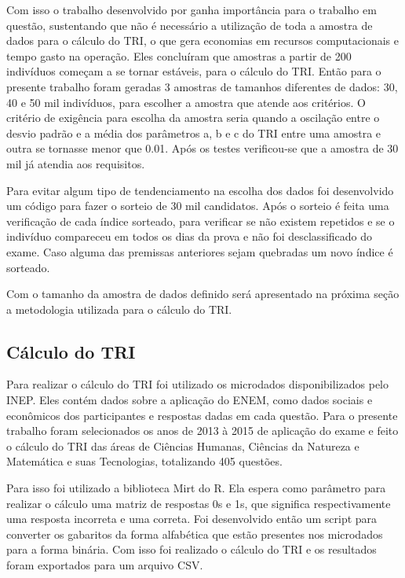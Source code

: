 \documentclass[article,	12pt,	oneside, a4paper,	english, brazil, sumario=tradicional, section=TITLE]{abntex2}
\begin{document}
 	Com isso o trabalho desenvolvido por \cite{sancineto2005impacto} ganha importância para o trabalho em questão, sustentando que não é necessário a utilização de toda a amostra de dados para o cálculo do TRI, o que gera economias em recursos computacionais e tempo gasto na operação. Eles concluíram que amostras a partir de 200 indivíduos começam a se tornar estáveis, para o cálculo do TRI. Então para o presente trabalho foram geradas 3 amostras de tamanhos diferentes de dados: 30, 40 e 50 mil indivíduos, para escolher a amostra que atende aos critérios. O critério de exigência para escolha da amostra seria quando a oscilação entre o desvio padrão e a média dos parâmetros a, b e c do TRI entre uma amostra e outra se tornasse menor que 0.01. Após os testes verificou-se que a amostra de 30 mil já atendia aos requisitos.
    
 	Para evitar algum tipo de tendenciamento na escolha dos dados foi desenvolvido um código para fazer o sorteio de 30 mil candidatos. Após o sorteio é feita uma verificação de cada índice sorteado, para verificar se não existem repetidos e se o indivíduo compareceu em todos os dias da prova e não foi desclassificado do exame. Caso alguma das premissas anteriores sejam quebradas um novo índice é sorteado.
   
   Com o tamanho da amostra de dados definido será apresentado na próxima seção a metodologia utilizada para o cálculo do TRI.

\subsection{Cálculo do TRI}
Para realizar o cálculo do TRI foi utilizado os microdados disponibilizados pelo INEP. Eles contém dados sobre a aplicação do ENEM, como dados sociais e econômicos dos participantes e respostas dadas em cada questão. Para o presente trabalho foram selecionados os anos de 2013 à 2015 de aplicação do exame e feito o cálculo do TRI das áreas de Ciências Humanas, Ciências da Natureza e Matemática e suas Tecnologias, totalizando 405 questões.

	Para isso foi utilizado a biblioteca Mirt do R. Ela espera como parâmetro para realizar o cálculo uma matriz de respostas 0s e 1s, que significa respectivamente uma resposta incorreta e uma correta. Foi desenvolvido então um script para converter os gabaritos da forma alfabética que estão presentes nos microdados para a forma binária. Com isso foi realizado o cálculo do TRI e os resultados foram exportados para um arquivo CSV.
 
\end{document}
